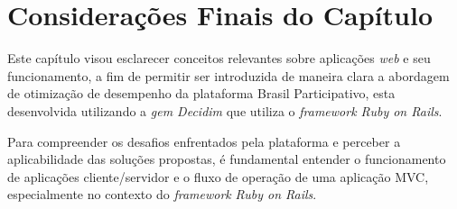 \section{Considerações Finais do Capítulo}
Este capítulo visou esclarecer conceitos relevantes sobre aplicações \textit{web} e seu funcionamento, a fim de permitir ser introduzida de maneira clara a abordagem de otimização de desempenho da plataforma Brasil Participativo, esta desenvolvida utilizando a \textit{gem Decidim} que utiliza o \textit{framework Ruby on Rails}.

Para compreender os desafios enfrentados pela plataforma e perceber a aplicabilidade das soluções propostas, é fundamental entender o funcionamento de aplicações cliente/servidor e o fluxo de operação de uma aplicação MVC, especialmente no contexto do \textit{framework} \textit{Ruby on Rails}.